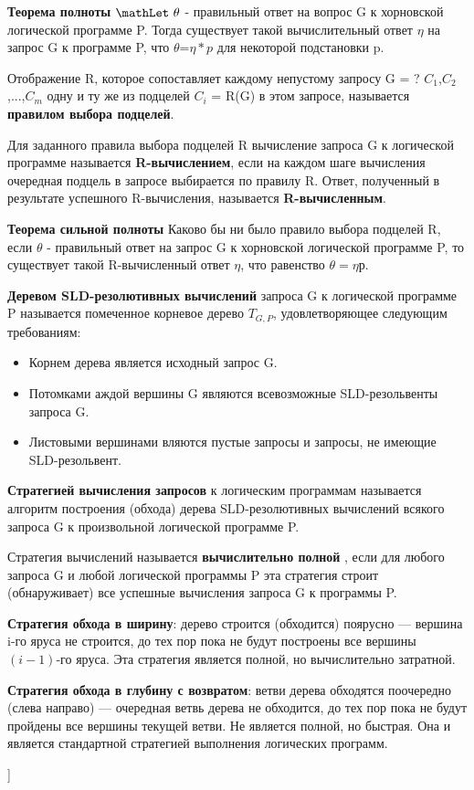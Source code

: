 \textbf{Теорема полноты}
$\mathLet ~\theta$ - правильный ответ на вопрос G к хорновской логической программе P. Тогда существует такой вычислительный ответ $\eta$ на запрос G к программе P, что $\theta$=$\eta *p $ для некоторой подстановки p.

Отображение R, которое сопоставляет каждому непустому запросу G = ? $C_{1}$,$C_{2}$,...,$C_{m}$ одну и ту же из подцелей $C_{i}$ = R(G) в этом запросе, называется \textbf{правилом выбора подцелей}. 

Для заданного правила выбора подцелей R вычисление запроса G к логической программе называется \textbf{R-вычислением}, если на каждом шаге вычисления очередная подцель в запросе выбирается по правилу R. 
Ответ, полученный в результате успешного R-вычисления, называется \textbf{R-вычисленным}. 

\textbf{Теорема сильной полноты} Каково бы ни было правило выбора подцелей R, если $\theta$ - правильный ответ на запрос G к хорновской логической программе P, то существует такой R-вычисленный ответ $\eta$, что равенство $\theta = \eta$р. 

\textbf{Деревом SLD-резолютивных вычислений} запроса G к логической программе P называется помеченное корневое дерево $T_{G,P}$, удовлетворяющее следующим требованиям: 
\begin{itemize}
    \item Корнем дерева является исходный запрос G.
    \item Потомками аждой вершины G являются всевозможные SLD-резольвенты запроса G.  
    \item Листовыми вершинами вляются пустые запросы и запросы, не имеющие SLD-резольвент. 
\end{itemize}

\textbf{Стратегией вычисления запросов} к логическим программам называется алгоритм построения (обхода) дерева SLD-резолютивных вычислений всякого запроса G к произвольной логической программе P.

Стратегия вычислений называется \textbf{вычислительно полной} , если для любого запроса G и любой логической программы P эта стратегия строит (обнаруживает) все успешные вычисления запроса G к программы P. 

\textbf{Стратегия обхода в ширину}: дерево строится (обходится) поярусно --- вершина i-го яруса не строится, до тех пор пока не будут построены все вершины $(i - 1)$-го яруса. Эта стратегия является полной, но вычислительно затратной.

\textbf{Стратегия обхода в глубину с возвратом}: ветви дерева обходятся поочередно (слева направо) — очередная ветвь дерева не обходится, до тех пор пока не будут пройдены все вершины текущей ветви. Не является полной, но быстрая. Она и является стандартной стратегией выполнения логических программ.

\bigbreak
[\cite[page 69-96]{replace_me}]